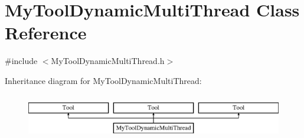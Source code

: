\hypertarget{classMyToolDynamicMultiThread}{\section{My\-Tool\-Dynamic\-Multi\-Thread Class Reference}
\label{classMyToolDynamicMultiThread}
}


{\ttfamily \#include $<$My\-Tool\-Dynamic\-Multi\-Thread.\-h$>$}

Inheritance diagram for My\-Tool\-Dynamic\-Multi\-Thread\-:\begin{figure}[H]
\begin{center}
\leavevmode
\includegraphics[height=2.000000cm]{classMyToolDynamicMultiThread}
\end{center}
\end{figure}
